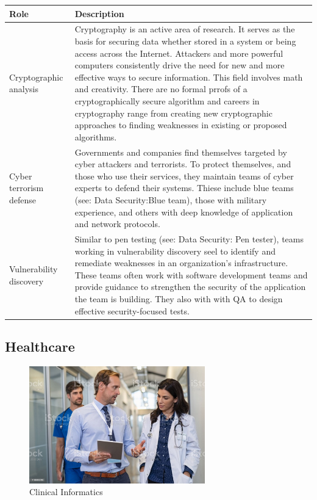 \begin{table}[H]
	\begin{center}
		\begin{tabular}{p{1in}|p{3.4in}} 
			\textbf{Role} & \textbf{Description}\\
			\hline
			Cryptographic analysis & Cryptography is an active area of research. It serves as the basis for securing data whether stored in a system or being access across the Internet. Attackers and more powerful computers consistently drive the need for new and more effective ways to secure information. This field involves math and creativity. There are no formal prrofs of a cryptographically secure algorithm and careers in cryptography range from creating new cryptographic approaches to finding weaknesses in existing or proposed algorithms.\\
			\hline
			Cyber terrorism defense & Governments and companies find themselves targeted by cyber attackers and terrorists. To protect themselves, and those who use their services, they maintain teams of cyber experts to defend their systems. Thiese include blue teams (see: Data Security:Blue team), those with military experience, and others with deep knowledge of application and network protocols.\\
			\hline
			Vulnerability discovery & Similar to pen testing (see: Data Security: Pen tester), teams working in vulnerability discovery seel to identify and remediate weaknesses in an organization's infrastructure. These teams often work with software development teams and provide guidance to strengthen the security of the application the team is building. They also with with QA to design effective security-focused tests.\\
			\hline
		\end{tabular}
	\end{center}
\end{table}

\subsection{Healthcare}

\begin{figure}[H]
	\begin{center}
		\caption{Clinical Informatics}
		\vskip 4pt
		\includegraphics[height=2in]{images/careers/istockphoto-1189303763-1024x1024.jpg}
	\end{center}
\end{figure}

